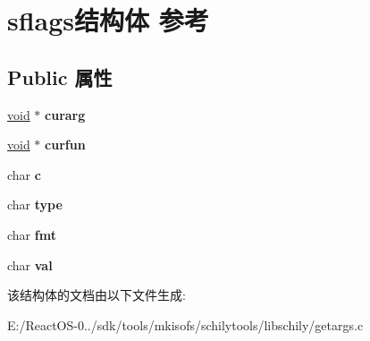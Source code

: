\hypertarget{structsflags}{}\section{sflags结构体 参考}
\label{structsflags}
\subsection*{Public 属性}
\begin{DoxyCompactItemize}
\item 
\mbox{\label{structsflags_a2850d2622e4a024936e25ff2b4a32c45}} 
\hyperlink{interfacevoid}{void} $\ast$ {\bfseries curarg}
\item 
\mbox{\label{structsflags_a10a226767fef3e2f1372685e09a2ac26}} 
\hyperlink{interfacevoid}{void} $\ast$ {\bfseries curfun}
\item 
\mbox{\label{structsflags_af2ff9d22863b12304eb5b329e136111f}} 
char {\bfseries c}
\item 
\mbox{\label{structsflags_ab61792f229e21000ef57c27fd570f8e8}} 
char {\bfseries type}
\item 
\mbox{\label{structsflags_abf6a95c48fecafac231e07ad93c5fd9c}} 
char {\bfseries fmt}
\item 
\mbox{\label{structsflags_abe1b336d15f593794611293a1daa4dce}} 
char {\bfseries val}
\end{DoxyCompactItemize}


该结构体的文档由以下文件生成\+:\begin{DoxyCompactItemize}
\item 
E\+:/\+React\+O\+S-\/0../sdk/tools/mkisofs/schilytools/libschily/getargs.\+c\end{DoxyCompactItemize}

